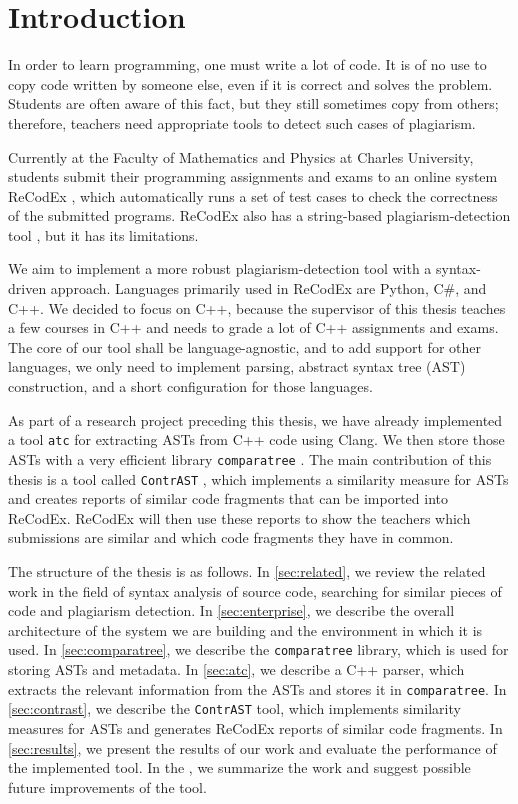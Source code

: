 \chapter*{Introduction}

In order to learn programming, one must write a lot of code.
It is of no use to copy code written by someone else, even if it is correct and solves the problem.
Students are often aware of this fact, but they still sometimes copy from others; therefore, teachers need appropriate tools to detect such cases of plagiarism.

Currently at the Faculty of Mathematics and Physics at Charles University, students submit their programming assignments and exams to an online system ReCodEx \cite{recodex}, which automatically runs a set of test cases to check the correctness of the submitted programs.
ReCodEx also has a string-based plagiarism-detection tool \cite{comparatrix}, but it has its limitations.

We aim to implement a more robust plagiarism-detection tool with a syntax-driven approach.
Languages primarily used in ReCodEx are Python, C\#, and C++.
We decided to focus on C++, because the supervisor of this thesis teaches a few courses in C++ and needs to grade a lot of C++ assignments and exams.
The core of our tool shall be language-agnostic, and to add support for other languages, we only need to implement parsing, abstract syntax tree (AST) construction, and a short configuration for those languages.

As part of a research project preceding this thesis, we have already implemented a tool \texttt{atc} \cite{atc} for extracting ASTs from C++ code using Clang.
We then store those ASTs with a very efficient library \texttt{comparatree} \cite{comparatree}.
The main contribution of this thesis is a tool called \texttt{ContrAST} \cite{contrast}, which implements a similarity measure for ASTs and creates reports of similar code fragments that can be imported into ReCodEx.
ReCodEx will then use these reports to show the teachers which submissions are similar and which code fragments they have in common.

The structure of the thesis is as follows.
In \autoref{sec:related}, we review the related work in the field of syntax analysis of source code, searching for similar pieces of code and plagiarism detection.
In \autoref{sec:enterprise}, we describe the overall architecture of the system we are building and the environment in which it is used.
In \autoref{sec:comparatree}, we describe the \texttt{comparatree} library, which is used for storing ASTs and metadata.
In \autoref{sec:atc}, we describe a C++ parser, which extracts the relevant information from the ASTs and stores it in \texttt{comparatree}.
In \autoref{sec:contrast}, we describe the \texttt{ContrAST} tool, which implements similarity measures for ASTs and generates ReCodEx reports of similar code fragments.
In \autoref{sec:results}, we present the results of our work and evaluate the performance of the implemented tool.
In the , we summarize the work and suggest possible future improvements of the tool.
